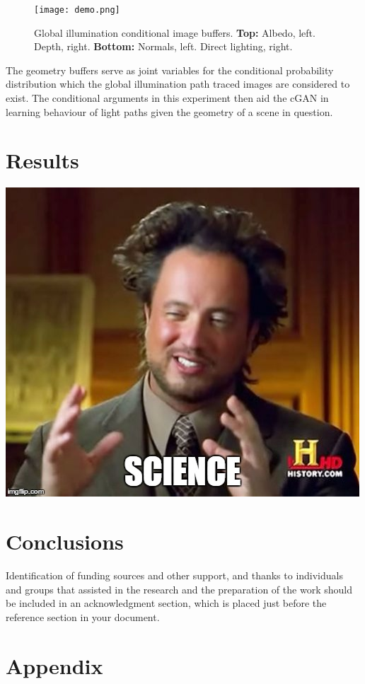 \documentclass[sigconf,authordraft]{acmart}
\begin{document}
\begin{figure}[h]
\caption{\textmd{Global illumination conditional image buffers. {\bf Top:} Albedo, left. Depth, right. {\bf Bottom:} Normals, left. Direct lighting, right.}}
\texttt{[image: demo.png]}
\label{Gbuf}
\end{figure}

The geometry buffers serve as joint variables for the conditional probability distribution which the global illumination path traced images are considered to exist. The conditional arguments in this experiment then aid the cGAN in learning behaviour of light paths given the geometry of a scene in question. 

\section{Results}
\includegraphics[scale=.5]{science.jpg}
\section{Conclusions}



\begin{acks}
Identification of funding sources and other support, and thanks to
individuals and groups that assisted in the research and the
preparation of the work should be included in an acknowledgment
section, which is placed just before the reference section in your
document.
\end{acks}




\appendix

\section{Appendix}
\end{document}
